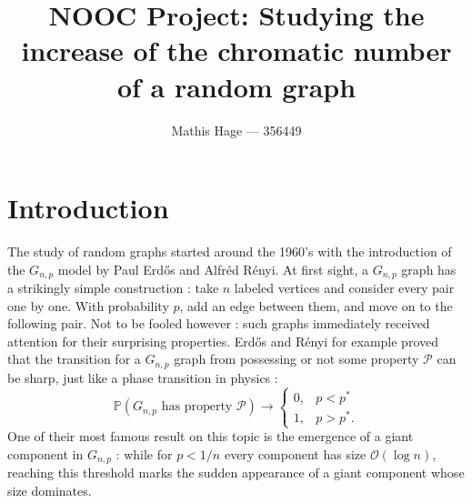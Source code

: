 \documentclass[10pt,journal,a4paper]{IEEEtran}
\theoremstyle{definition}   %
\begin{document}
%
\title{NOOC Project: Studying the increase of the chromatic number of a random graph}
%
% 
\author{Mathis Hage --- 356449}


\maketitle
\IEEEdisplaynotcompsoctitleabstractindextext

\section{Introduction}

The study of random graphs started around the 1960's with the introduction of the $G_{n, p}$ model by Paul Erdős and Alfréd Rényi. At first sight, a $G_{n,p}$ graph has a strikingly simple construction : take $n$ labeled vertices and consider every pair one by one. With probability $p$, add an edge between them, and move on to the following pair. Not to be fooled however : such graphs immediately received attention for their surprising properties. Erdős and Rényi for example proved that the transition for a $G_{n, p}$ graph from possessing or not some property $\mathcal{P}$ can be sharp, just like a phase transition in physics :
$$
\mathbb{P}(G_{n, p}\text{ has property } \mathcal{P}) \to \begin{cases}
	0, & p < p^*\\
	1, & p > p^*.
\end{cases} 
$$ 
One of their most famous result on this topic is the emergence of a giant component in $G_{n, p}$ : while for $p < 1 / n$ every component has size $\mathcal{O}(\log n)$, reaching this threshold marks the sudden appearance of a giant component whose size dominates.
\end{document}
